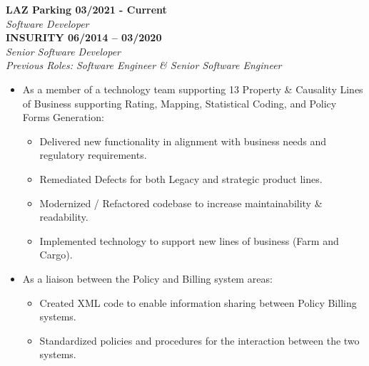 


\begin{cvparagraph}

   {\normalsize \textbf{LAZ Parking \hfill 03/2021 - Current}} \\
   {\sl Software Developer} \\

   {\normalsize \textbf{ INSURITY \hfill 06/2014 -- 03/2020}} \\
   {\sl Senior Software Developer} \\
   {\sl Previous Roles: Software Engineer \& Senior Software Engineer} \\

   \begin{itemize}
      \item As a member of a technology team supporting 13 Property \& Causality
         Lines of Business supporting Rating, Mapping, Statistical Coding, and Policy 
         Forms Generation:
         \begin{itemize}
            \item Delivered new functionality in alignment with business needs and 
               regulatory requirements.
            \item Remediated Defects for both Legacy and strategic product lines. 
            \item Modernized / Refactored codebase to increase maintainability \& 
               readability.
            \item Implemented technology to support new lines of business (Farm and Cargo).
         \end{itemize}

      \item As a liaison between the Policy and Billing system areas:
         \begin{itemize}
            \item Created XML code to enable information sharing between Policy Billing 
               systems.
            \item Standardized policies and procedures for the interaction between the 
               two systems.
         \end{itemize}


\end{itemize}
\end{cvparagraph}
